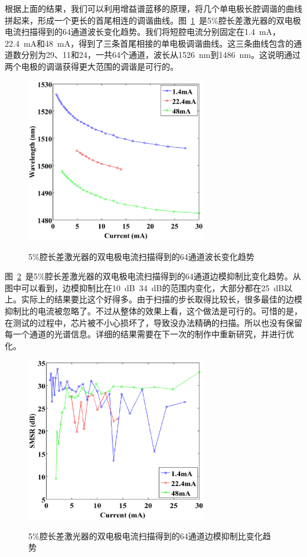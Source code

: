 \documentclass{ZJUthesis}
\begin{document}
根据上面的结果，我们可以利用增益谱蓝移的原理，将几个单电极长腔调谐的曲线拼起来，形成一个更长的首尾相连的调谐曲线。图~\ref{fig_2d4}~是5\%腔长差激光器的双电极电流扫描得到的64通道波长变化趋势。我们将短腔电流分别固定在1.4~mA，22.4~mA和48~mA，得到了三条首尾相接的单电极调谐曲线。这三条曲线包含的通道数分别为29、11和24，一共64个通道，波长从1526~nm到1486~nm。这说明通过两个电极的调谐获得更大范围的调谐是可行的。

\begin{figure}[htbp]
  \centering
  \includegraphics[width=0.7\textwidth]{./Pictures/2d4.eps}\\
  \caption{5\%腔长差激光器的双电极电流扫描得到的64通道波长变化趋势}
  \label{fig_2d4}
\end{figure}

图~\ref{fig_2d5}~是5\%腔长差激光器的双电极电流扫描得到的64通道边模抑制比变化趋势。从图中可以看到，边模抑制比在10~dB~34~dB的范围内变化，大部分都在25~dB以上。实际上的结果要比这个好得多。由于扫描的步长取得比较长，很多最佳的边模抑制比的电流被忽略了。不过从整体的效果上看，这个做法是可行的。可惜的是，在测试的过程中，芯片被不小心损坏了，导致没办法精确的扫描。所以也没有保留每一个通道的光谱信息。详细的结果需要在下一次的制作中重新研究，并进行优化。

\begin{figure}[htbp]
  \centering
  \includegraphics[width=0.7\textwidth]{./Pictures/2d5.eps}\\
  \caption{5\%腔长差激光器的双电极电流扫描得到的64通道边模抑制比变化趋势}
  \label{fig_2d5}
\end{figure}
\end{document}
